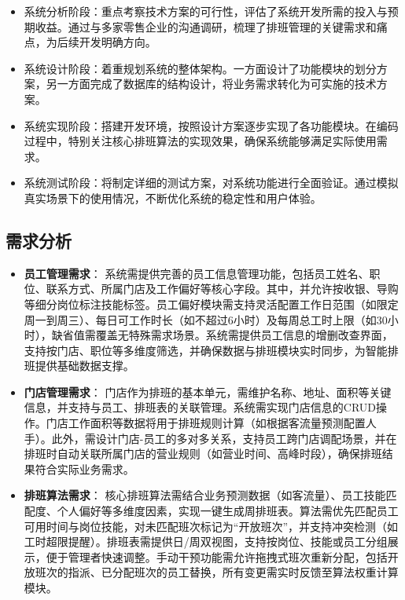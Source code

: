 \documentclass{ctexart}
\begin{document}
\begin{itemize}
    \item 系统分析阶段：重点考察技术方案的可行性，评估了系统开发所需的投入与预期收益。通过与多家零售企业的沟通调研，梳理了排班管理的关键需求和痛点，为后续开发明确方向。
    
    \item 系统设计阶段：着重规划系统的整体架构。一方面设计了功能模块的划分方案，另一方面完成了数据库的结构设计，将业务需求转化为可实施的技术方案。
    
    \item 系统实现阶段：搭建开发环境，按照设计方案逐步实现了各功能模块。在编码过程中，特别关注核心排班算法的实现效果，确保系统能够满足实际使用需求。
    
    \item 系统测试阶段：将制定详细的测试方案，对系统功能进行全面验证。通过模拟真实场景下的使用情况，不断优化系统的稳定性和用户体验。
\end{itemize}

\subsection{需求分析}
\begin{itemize}
    \item \textbf{员工管理需求}：  
    系统需提供完善的员工信息管理功能，包括员工姓名、职位、联系方式、所属门店及工作偏好等核心字段。其中，并允许按收银、导购等细分岗位标注技能标签。员工偏好模块需支持灵活配置工作日范围（如限定周一到周三）、每日可工作时长（如不超过6小时）及每周总工时上限（如30小时），缺省值需覆盖无特殊需求场景。系统需提供员工信息的增删改查界面，支持按门店、职位等多维度筛选，并确保数据与排班模块实时同步，为智能排班提供基础数据支撑。

    \item \textbf{门店管理需求}：  
    门店作为排班的基本单元，需维护名称、地址、面积等关键信息，并支持与员工、排班表的关联管理。系统需实现门店信息的CRUD操作。门店工作面积等数据将用于排班规则计算（如根据客流量预测配置人手）。此外，需设计门店-员工的多对多关系，支持员工跨门店调配场景，并在排班时自动关联所属门店的营业规则（如营业时间、高峰时段），确保排班结果符合实际业务需求。

    \item \textbf{排班算法需求}：  
    核心排班算法需结合业务预测数据（如客流量）、员工技能匹配度、个人偏好等多维度因素，实现一键生成周排班表。算法需优先匹配员工可用时间与岗位技能，对未匹配班次标记为“开放班次”，并支持冲突检测（如工时超限提醒）。排班表需提供日/周双视图，支持按岗位、技能或员工分组展示，便于管理者快速调整。手动干预功能需允许拖拽式班次重新分配，包括开放班次的指派、已分配班次的员工替换，所有变更需实时反馈至算法权重计算模块。
\end{itemize}
\end{document}
